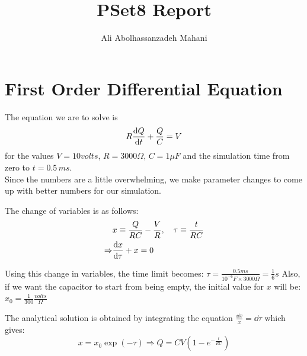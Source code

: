 \documentclass[12pt, a4paper]{article}
\title{PSet8 Report}
\author{Ali Abolhassanzadeh Mahani}
\begin{document}
	\maketitle
	\section{First Order Differential Equation}
	The equation we are to solve is
	\begin{equation}
		R \dv{Q}{t} + \frac{Q}{C} = V
	\end{equation}
	for the values $V= 10 volts$, $R = 3000 \Omega$, $C = 1 \mu F$ and the simulation time from zero to $t = 0.5\, ms$.\\
	Since the numbers are a little overwhelming, we make parameter changes to come up with better numbers for our simulation.
	
	The change of variables is as follows:
	\begin{equation} \label{eq:change}
		\begin{aligned}
			&x \equiv \frac{Q}{R C} - \frac{V}{R}, \quad \tau \equiv \frac{t}{R C}\\
			\Rightarrow  &\dv{x}{\tau} + x = 0
		\end{aligned}
	\end{equation}
	
	Using this change in variables, the time limit becomes: $\tau = \frac{0.5 ms}{10^{-6} F \times 3000 \Omega} = \frac{1}{6} s$
	Also, if we want the capacitor to start from being empty, the initial value for $x$ will be: $x_0 = \frac{1}{300} \frac{volts}{\Omega}$
	
	The analytical solution is obtained by integrating the equation $\frac{\dd{x}}{x} = \dd{\tau}$
	which gives:
	\begin{equation} \label{eq:analytical}
		x = x_0 \exp(- \tau) \Rightarrow Q = C V (1 - e^{- \frac{t}{R C}})
	\end{equation}
\end{document}
